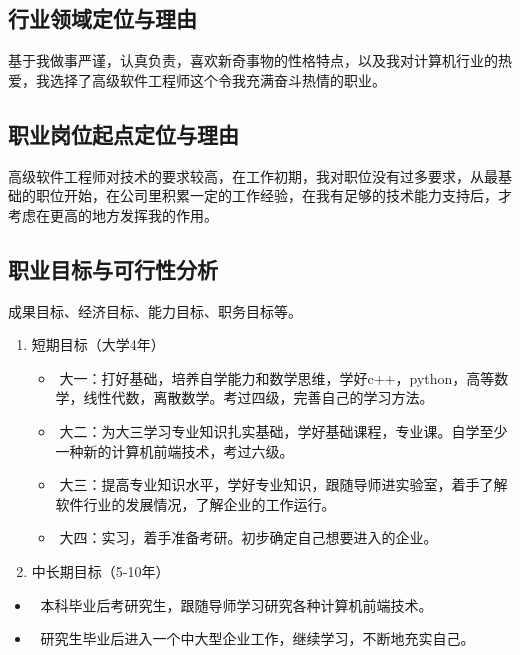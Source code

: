 \documentclass{article}
\begin{document}
\subsection{行业领域定位与理由}
基于我做事严谨，认真负责，喜欢新奇事物的性格特点，以及我对计算机行业的热爱，我选择了高级软件工程师这个令我充满奋斗热情的职业。\par
\subsection{职业岗位起点定位与理由}
高级软件工程师对技术的要求较高，在工作初期，我对职位没有过多要求，从最基础的职位开始，在公司里积累一定的工作经验，在我有足够的技术能力支持后，才考虑在更高的地方发挥我的作用。\par
\subsection{职业目标与可行性分析}
\par
成果目标、经济目标、能力目标、职务目标等。\par 
\begin{enumerate}[(1)]
	\item 短期目标（大学4年）
\begin{itemize}
	\item 大一：打好基础，培养自学能力和数学思维，学好c++，python，高等数学，线性代数，离散数学。考过四级，完善自己的学习方法。
	\item 大二：为大三学习专业知识扎实基础，学好基础课程，专业课。自学至少一种新的计算机前端技术，考过六级。
	\item 大三：提高专业知识水平，学好专业知识，跟随导师进实验室，着手了解软件行业的发展情况，了解企业的工作运行。
	\item 大四：实习，着手准备考研。初步确定自己想要进入的企业。
\end{itemize}
	\item 中长期目标（5-10年）

\end{enumerate}
\begin{itemize}
    \item 	本科毕业后考研究生，跟随导师学习研究各种计算机前端技术。
    \item 	研究生毕业后进入一个中大型企业工作，继续学习，不断地充实自己。

\end{itemize}
\end{document}

